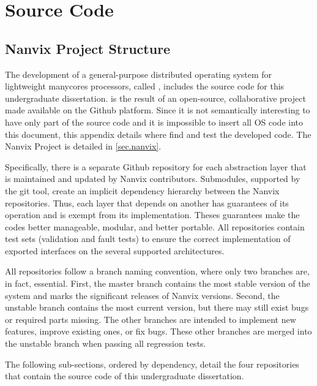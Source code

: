 \chapter{Source Code}
\label{ch:source-code}

\renewcommand{\thefigure}{\thechapter-\arabic{figure}}
\setcounter{figure}{0}

\renewcommand{\thelisting}{\thechapter-\arabic{listing}}
\setcounter{listing}{0}

\section{Nanvix Project Structure}

	The development of a general-purpose distributed operating system for
	lightweight manycores processors, called \nanvixos, includes the source
	code for this undergraduate dissertation. \nanvixos is the result of an
	open-source, collaborative project made available on the Github platform.
	Since it is not semantically interesting to have only part of the source
	code and it is impossible to insert all OS code into this document, this
	appendix details where find and test the developed code. The Nanvix
	Project is detailed in \autoref{sec.nanvix}.

	Specifically, there is a separate Github repository for each abstraction
	layer that is maintained and updated by Nanvix contributors. Submodules,
	supported by the git tool, create an implicit dependency hierarchy
	between the Nanvix repositories. Thus, each layer that depends on another
	has guarantees of its operation and is exempt from its implementation.
	Theses guarantees make the codes better manageable, modular, and better
	portable. All repositories contain test sets (validation and fault tests)
	to ensure the correct implementation of exported interfaces on the several
	supported architectures.

	All repositories follow a branch naming convention, where only two
	branches are, in fact, essential. First, the master branch contains
	the most stable version of the system and marks the significant
	releases of Nanvix versions. Second, the unstable branch contains
	the most current version, but there may still exist bugs or required
	parts missing. The other branches are intended to implement new features,
	improve existing ones, or fix bugs. These other branches are merged
	into the unstable branch when passing all regression tests.

	The following sub-sections, ordered by dependency, detail the four
	repositories that contain the source code of this undergraduate dissertation.


